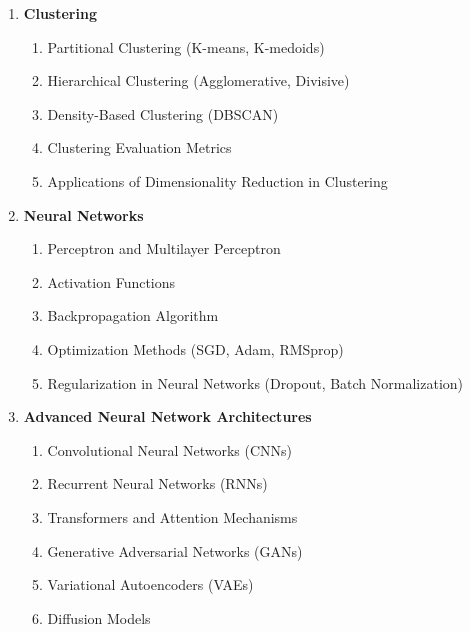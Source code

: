 \documentclass[a4paper,10pt]{article}
\begin{document}
\begin{enumerate}[label=\Roman*.]
    \item \textbf{Clustering}
    \begin{enumerate}[label=\alph*.]
        \item Partitional Clustering (K-means, K-medoids)
        \item Hierarchical Clustering (Agglomerative, Divisive)
        \item Density-Based Clustering (DBSCAN)
        \item Clustering Evaluation Metrics
        \item Applications of Dimensionality Reduction in Clustering
    \end{enumerate}

    \item \textbf{Neural Networks}
    \begin{enumerate}[label=\alph*.]
        \item Perceptron and Multilayer Perceptron
        \item Activation Functions
        \item Backpropagation Algorithm
        \item Optimization Methods (SGD, Adam, RMSprop)
        \item Regularization in Neural Networks (Dropout, Batch Normalization)
    \end{enumerate}

    \item \textbf{Advanced Neural Network Architectures}
    \begin{enumerate}[label=\alph*.]
        \item Convolutional Neural Networks (CNNs)
        \item Recurrent Neural Networks (RNNs)
        \item Transformers and Attention Mechanisms
        \item Generative Adversarial Networks (GANs)
        \item Variational Autoencoders (VAEs)
        \item Diffusion Models
    \end{enumerate}
\end{enumerate}

\vspace{1.5em}

\newpage
\end{document}
